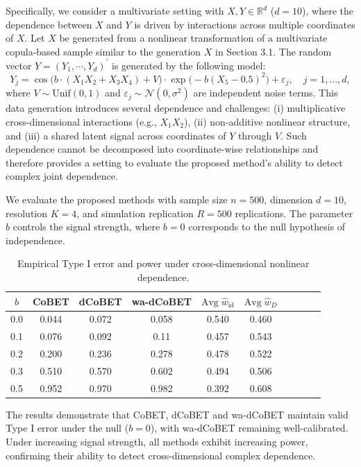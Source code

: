 \documentclass[12pt,reqno,oneside]{amsbook}
\theoremstyle{definition}
\theoremstyle{remark}
\begin{document}
Specifically, we consider a multivariate setting with $X, Y \in \mathbb{R}^d$ ($d=10$), where the dependence between $X$ and $Y$ is driven by interactions across multiple coordinates of $X$. Let $X$ be generated from a nonlinear transformation of a multivariate copula-based sample similar to the generation $X$ in Section 3.1. The random vector $Y=(Y_1,\cdots,Y_d)^\prime$ is generated by the following model:
\begin{equation}
Y_j = \cos\!\bigl( b \cdot (X_1 X_2 + X_3 X_4) + V \bigr)
\cdot \exp\!\bigl( -b (X_5 - 0.5)^2 \bigr)
+ \varepsilon_j, 
\quad j = 1,\dots,d,
\end{equation}
where $V \sim \mathrm{Unif}(0,1)$ and $\varepsilon_j \sim \mathcal{N}(0, \sigma^2)$ are independent noise terms.
This data generation introduces several dependence and challenges:
(i) multiplicative cross-dimensional interactions (e.g., $X_1 X_2$),
(ii) non-additive nonlinear structure,
and (iii) a shared latent signal across coordinates of $Y$ through $V$.
Such dependence cannot be decomposed into coordinate-wise relationships and therefore provides a setting to evaluate the proposed method's ability to detect complex joint dependence.

We evaluate the proposed methods with sample size $n=500$, dimension $d=10$, resolution $K=4$, and simulation replication $R=500$ replications. The parameter $b$ controls the signal strength, where $b=0$ corresponds to the null hypothesis of independence.

\begin{table}[ht]
\centering
\begin{tabular}{cccccccccc}
\hline
$b$ & CoBET & dCoBET & wa-dCoBET & $\mbox{Avg}\; \hat{w}_{\text{id}}$ & $\mbox{Avg}\;\hat{w}_{D}$ \\
\hline
 0.0 & 0.044 & 0.072 & 0.058 & 0.540 & 0.460 \\
 0.1 & 0.076 & 0.092 & 0.11 & 0.457 & 0.543 \\
 0.2 & 0.200 & 0.236 & 0.278 & 0.478 & 0.522 \\
 0.3 & 0.510 & 0.570 & 0.602 & 0.494 & 0.506 \\
 0.5 & 0.952 & 0.970 & 0.982 & 0.392 & 0.608 \\
\hline
\end{tabular}
\caption{Empirical Type I error and power under cross-dimensional nonlinear dependence.}
\end{table}

The results demonstrate that CoBET, dCoBET and wa-dCoBET maintain valid Type I error under the null ($b=0$), with wa-dCoBET remaining well-calibrated. Under increasing signal strength, all methods exhibit increasing power, confirming their ability to detect cross-dimensional complex dependence.
\end{document}
